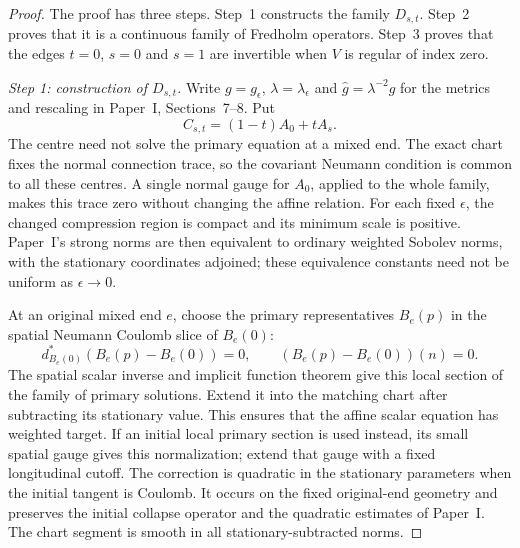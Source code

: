 \documentclass[11pt]{amsart}
\theoremstyle{definition}
\theoremstyle{remark}
\theoremstyle{plain}
\numberwithin{equation}{section}
\begin{document}
\begin{proof}
The proof has three steps. Step~1 constructs the family $D_{s,t}$.
Step~2 proves that it is a continuous family of Fredholm operators.
Step~3 proves that the edges $t=0$, $s=0$ and $s=1$ are invertible when
$V$ is regular of index zero.

\emph{Step 1: construction of $D_{s,t}$.} Write $g=g_\epsilon$, $\lambda=\lambda_\epsilon$ and
$\widehat g=\lambda^{-2}g$ for the metrics and rescaling in
Paper~I, Sections~7--8. Put
\begin{equation}\label{eq:affine-centers}
 C_{s,t}=(1-t)A_0+tA_s.
\end{equation}
The centre need not solve the primary equation at a mixed end.
The exact chart fixes the normal connection trace, so the
covariant Neumann condition is common to all these centres.
A single normal gauge for $A_0$, applied to the whole family,
makes this trace zero without changing the affine relation.
For each fixed $\epsilon$, the changed compression region is
compact and its minimum scale is positive. Paper~I's strong
norms are then equivalent to ordinary weighted Sobolev norms,
with the stationary coordinates adjoined; these equivalence
constants need not be uniform as $\epsilon\to0$.

At an original mixed end $e$, choose the primary representatives
$B_e(p)$ in the spatial Neumann Coulomb slice of $B_e(0)$:
\begin{equation}\label{eq:affine-end-slice}
 d_{B_e(0)}^*(B_e(p)-B_e(0))=0,
 \qquad (B_e(p)-B_e(0))(n)=0.
\end{equation}
The spatial scalar inverse and implicit function theorem give
this local section of the family of primary solutions. Extend it into
the matching chart after subtracting its stationary value. This
ensures that the affine scalar equation has weighted target.
If an initial local primary section is used instead, its small
spatial gauge gives this normalization; extend that gauge with
a fixed longitudinal cutoff. The correction is quadratic in the
stationary parameters when the initial tangent is Coulomb. It
occurs on the fixed original-end geometry and preserves the
initial collapse operator and the quadratic estimates of Paper~I.
The chart segment is smooth in all stationary-subtracted norms.


\end{proof}
\end{document}
